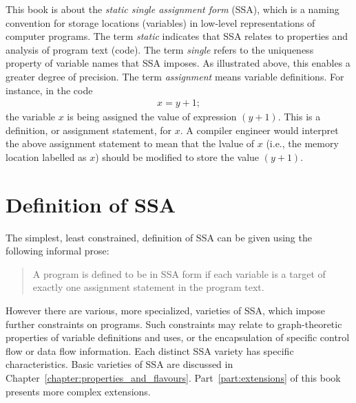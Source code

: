 This book is about the \textit{static single assignment form} (SSA),
which is a naming convention for storage locations (variables)
in low-level representations
of computer programs.
The term \textit{static} indicates that SSA relates to properties
and analysis of program text (code).
The term \textit{single} refers to the uniqueness property of
variable names that SSA imposes. As illustrated above, this enables
a greater degree of precision.
The term \textit{assignment} means variable definitions. For
instance, in the code
\begin{equation*}
\begin{array}{l}
x = y+1;
\end{array}
\end{equation*}
the variable $x$ is being assigned the value of expression $(y+1)$.
This is a definition, or assignment statement, for $x$.
A compiler engineer would interpret the above assignment statement
to mean that the lvalue of
$x$ (i.e., the memory location labelled as $x$) should be modified to store
the value $(y+1)$.


\section{Definition of SSA}


The simplest, 
least constrained, definition of SSA can be given using the following informal prose:

\begin{quote}
A program is defined to be in SSA
form if each variable is a target of
exactly one assignment statement in the
program text.
\end{quote}



However
there are various, more specialized, varieties of SSA,
which impose further constraints on programs.
Such constraints may relate to %
graph-theoretic properties of variable definitions and uses, or
the encapsulation of specific control flow or data flow information.
Each distinct SSA variety has specific characteristics. Basic
varieties
of SSA are discussed in
Chapter~\ref{chapter:properties_and_flavours}.
Part~\ref{part:extensions}
of this book presents more complex extensions.

